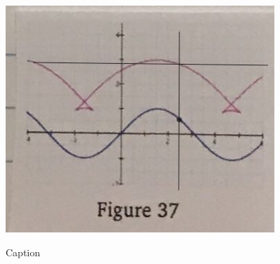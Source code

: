 \begin{figure}[h]
  \begin{minipage}[b]{\w}
    \centering
    \label{constructed:5}
    \includegraphics[width=\fw]{img/10-constructed/05.png}
    \caption{Caption}
    \vspace{4ex}
  \end{minipage} %
\end{figure}
